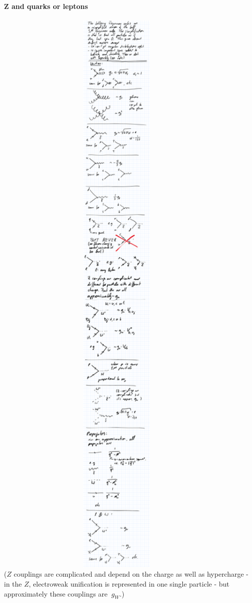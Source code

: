 \paragraph{Z and quarks or leptons\\}
\includegraphics[width=0.9\textwidth]{fig/summary/F_fZ}\\
($Z$ couplings are complicated and depend on the charge as well as hypercharge - in the $Z$, electroweak unification is represented in one single particle - but approximately these couplings are $~g_W$.)
